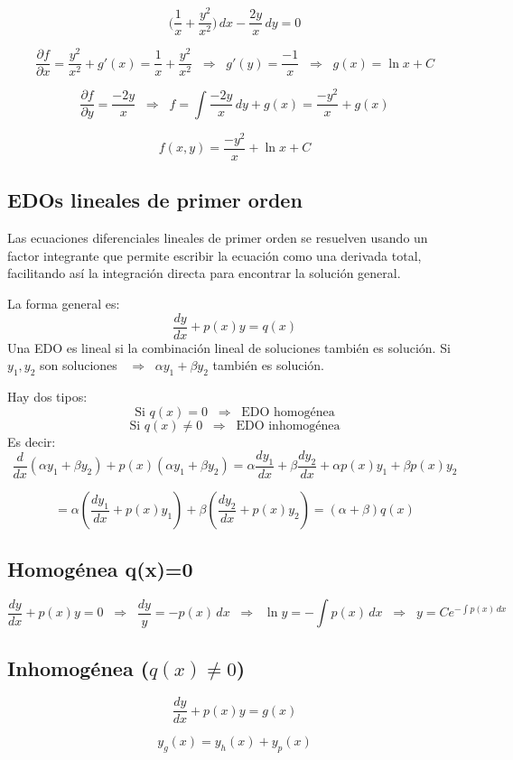 \documentclass[a4paper,12pt]{article}
\begin{document}
\[
\Big(\frac{1}{x}+\frac{y^2}{x^2}\Big)\,dx - \frac{2y}{x}\,dy=0
\]

\[
\frac{\partial f}{\partial x}=\frac{y^2}{x^2} + g'(x) = \frac{1}{x} + \frac{y^2}{x^2}
\;\;\Rightarrow\;\;
g'(y)=\frac{-1}{x}
\;\;\Rightarrow\;\;
g(x)=\ln x+C
\]

\[
\frac{\partial f}{\partial y}=\frac{-2y}{x}
\;\;\Rightarrow\;\;
f=\int \frac{-2y}{x}\,dy + g(x) = \frac{-y^2}{x} + g(x)
\]

\[
f(x,y)=\frac{-y^2}{x}+\ln x+C
\]

\subsection{EDOs lineales de primer orden}
\noindent
Las ecuaciones diferenciales lineales de primer orden se resuelven usando un 
factor integrante que permite escribir la ecuación como una derivada total, 
facilitando así la integración directa para encontrar la solución general.

\medskip
\noindent
La forma general es:
\[
\frac{dy}{dx}+p(x)y=q(x)
\]
Una EDO es lineal si la combinación lineal de soluciones también es solución.
\medskip
\noindent
Si $y_1,y_2$ son soluciones $\;\;\Rightarrow\;\;\alpha y_1+\beta y_2$ también es solución.

\medskip
\noindent
Hay dos tipos:
\[
\text{Si } q(x)=0 \;\;\Rightarrow\;\; \text{EDO homogénea}
\]
\[
\text{Si } q(x)\neq 0 \;\;\Rightarrow\;\; \text{EDO inhomogénea}
\]
Es decir:
\[
\frac{d}{dx}(\alpha y_1 + \beta y_2) + p(x)(\alpha y_1 + \beta y_2) 
= \alpha \frac{dy_1}{dx} + \beta \frac{dy_2}{dx} + \alpha p(x)y_1 + \beta p(x)y_2
\]

\[
= \alpha\left(\frac{dy_1}{dx}+p(x)y_1\right)+\beta\left(\frac{dy_2}{dx}+p(x)y_2\right)
= (\alpha+\beta)q(x)
\]

\subsection{Homogénea q(x)=0}

\[
\frac{dy}{dx}+p(x)y=0
\;\;\Rightarrow\;\;
\frac{dy}{y}=-p(x)\,dx
\;\;\Rightarrow\;\;
\ln y = -\int p(x)\,dx
\;\;\Rightarrow\;\;
y=Ce^{-\int p(x)\,dx}
\]
\subsection{Inhomogénea ($q(x)\neq 0$)}
\[
\frac{dy}{dx}+p(x)y=g(x)
\]

\[
y_g(x)=y_h(x)+y_p(x)
\]
\end{document}
